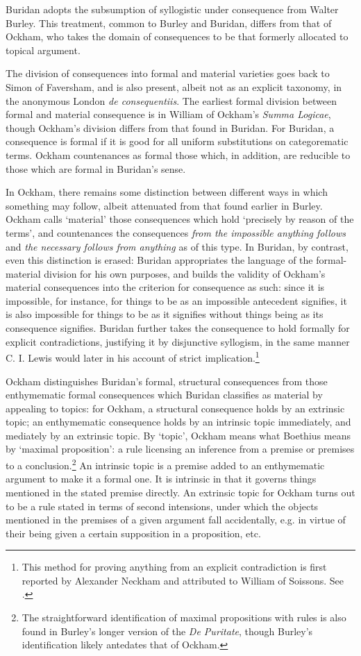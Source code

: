 \documentclass[]{article}
\begin{document}
		Buridan adopts the subsumption of syllogistic under consequence from Walter Burley. This treatment, common to Burley and Buridan, differs from that of Ockham, who takes the domain of consequences to be that formerly allocated to topical argument. 
		
		The division of consequences into formal and material varieties goes back to Simon of Faversham, and is also present, albeit not as an explicit taxonomy, in the anonymous London \textit{de consequentiis}. The earliest formal division between formal and material consequence is in William of Ockham's \textit{Summa Logicae}, though Ockham's division differs from that found in Buridan. For Buridan, a consequence is formal if it is good for all uniform substitutions on categorematic terms. Ockham countenances as formal those which, in addition, are reducible to those which are formal in Buridan's sense. 
		
		In Ockham, there remains some distinction between different ways in which something may follow, albeit attenuated from that found earlier in Burley. Ockham calls `material' those consequences which hold `precisely by reason of the terms', and countenances the consequences \textit{from the impossible anything follows} and \textit{the necessary follows from anything} as of this type. In Buridan, by contrast, even this distinction is erased: Buridan appropriates the language of the formal-material division for his own purposes, and builds the validity of Ockham's material consequences into the criterion for consequence as such: since it is impossible, for instance, for things to be as an impossible antecedent signifies, it is also impossible for things to be as it signifies without things being as its consequence signifies. Buridan further takes the consequence to hold formally for explicit contradictions, justifying it by disjunctive syllogism, in the same manner C. I. Lewis would later in his account of strict implication.\footnote{This method for proving anything from an explicit contradiction is first reported by Alexander Neckham and attributed to William of Soissons. See \cite{Martin2012}.} 
		
		Ockham distinguishes Buridan's formal, structural consequences from those enthymematic formal consequences which Buridan classifies as material by appealing to topics: for Ockham, a structural consequence holds by an extrinsic topic; an enthymematic consequence holds by an intrinsic topic immediately, and mediately by an extrinsic topic. By `topic', Ockham means what Boethius means by `maximal proposition': a rule licensing an inference from a premise or premises to a conclusion.\footnote{The straightforward identification of maximal propositions with rules is also found in Burley's longer version of the \textit{De Puritate}, though Burley's identification likely antedates that of Ockham.} An intrinsic topic is a premise added to an enthymematic argument to make it a formal one. It is intrinsic in that it governs things mentioned in the stated premise directly. An extrinsic topic for Ockham turns out to be a rule stated in terms of second intensions, under which the objects mentioned in the premises of a given argument fall accidentally, e.g. in virtue of their being given a certain supposition in a proposition, etc. 
		
\end{document}
